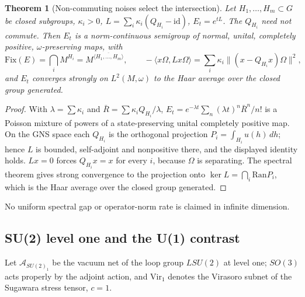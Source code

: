 \documentclass[12pt]{article}
\newtheorem{theorem}{Theorem}[section]
\theoremstyle{definition}
\theoremstyle{remark}
\begin{document}
\begin{theorem}[Non-commuting noises select the intersection]\label{thm:multi}
Let \(H_1,\dots,H_m\subset G\) be closed subgroups, \(\kappa_i>0\),
\(L=\sum_i\kappa_i(Q_{H_i}-\mathrm{id})\), \(E_t=e^{tL}\). The \(Q_{H_i}\) need not
commute. Then \(E_t\) is a norm-continuous semigroup of normal, unital, completely
positive, \(\omega\)-preserving maps, with
\[
\mathrm{Fix}(E)=\bigcap_iM^{H_i}=M^{\overline{\langle H_1,\dots,H_m\rangle}},
\qquad
-\langle x\Omega,Lx\Omega\rangle=\sum_i\kappa_i\|(x-Q_{H_i}x)\Omega\|^2,
\]
and \(E_t\) converges strongly on \(L^2(M,\omega)\) to the Haar average over the
closed group generated.
\end{theorem}
\begin{proof}
With \(\lambda=\sum\kappa_i\) and \(\bar R=\sum\kappa_iQ_{H_i}/\lambda\),
\(E_t=e^{-\lambda t}\sum_n(\lambda t)^n\bar R^n/n!\) is a Poisson mixture of powers of a
state-preserving unital completely positive map. On the GNS space each \(Q_{H_i}\)
is the orthogonal projection \(P_i=\int_{H_i}u(h)\,dh\); hence \(L\) is bounded,
self-adjoint and nonpositive there, and the displayed identity holds. \(Lx=0\) forces
\(Q_{H_i}x=x\) for every \(i\), because \(\Omega\) is separating. The spectral
theorem gives strong convergence to the projection onto \(\ker L=\bigcap_i\mathrm{Ran}P_i\),
which is the Haar average over the closed group generated.
\end{proof}
No uniform spectral gap or operator-norm rate is claimed in infinite dimension.

\subsection{SU(2) level one and the U(1) contrast}

Let \(\mathcal A_{SU(2)_1}\) be the vacuum net of the loop group \(LSU(2)\) at level
one; \(SO(3)\) acts properly by the adjoint action, and \(\mathrm{Vir}_1\) denotes the
Virasoro subnet of the Sugawara stress tensor, \(c=1\).
\end{document}
